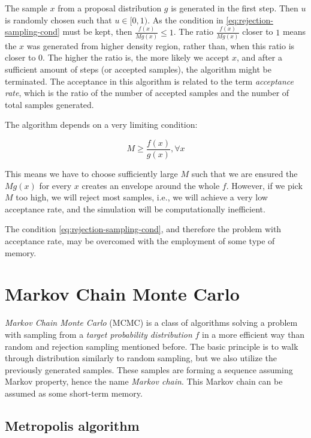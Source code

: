 \documentclass[
  digital, %
  oneside, %
  lof,     %
  lot,     %
]{fithesis4}
\begin{document}
The sample $x$ from a proposal distribution $g$ is generated in the first step.
Then $u$ is randomly chosen such that $u \in [0, 1)$.
As the condition in \eqref{eq:rejection-sampling-cond} must be kept, then $\frac{f(x)}{M g(x)} \leq 1$.
The ratio $\frac{f(x)}{M g(x)}$ closer to $1$ means the $x$ was generated from higher density region, rather than, when this ratio is closer to $0$.
The higher the ratio is, the more likely we accept $x$, and after a sufficient amount of steps (or accepted samples), the algorithm might be terminated.
The acceptance in this algorithm is related to the term \textit{acceptance rate}, which is the ratio of the number of accepted samples and the number of total samples generated.

The algorithm depends on a very limiting condition:

\begin{equation}\label{eq:rejection-sampling-cond}
  M \geq \frac{f(x)}{g(x)}, \forall x
\end{equation}

This means we have to choose sufficiently large $M$ such that we are ensured the $M g(x)$ for every $x$ creates an envelope around the whole $f$.
However, if we pick $M$ too high, we will reject most samples, i.e., we will achieve a very low acceptance rate, and the simulation will be computationally inefficient.

The condition \eqref{eq:rejection-sampling-cond}, and therefore the problem with acceptance rate, may be overcomed with the employment of some type of memory.


\section{Markov Chain Monte Carlo}

\textit{Markov Chain Monte Carlo} (MCMC) is a class of algorithms solving a problem with sampling from a \textit{target probability distribution} $f$ in a more efficient way than random and rejection sampling mentioned before.
The basic principle is to walk through distribution similarly to random sampling, but we also utilize the previously generated samples.
These samples are forming a sequence assuming Markov property, hence the name \textit{Markov chain}.
This Markov chain can be assumed as some short-term memory.


\subsection{Metropolis algorithm}
\end{document}
